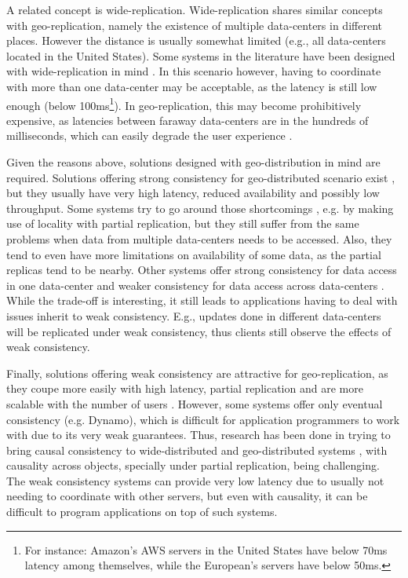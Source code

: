 A related concept is wide-replication.
Wide-replication shares similar concepts with geo-replication, namely the existence of multiple data-centers in different places. 
However the distance is usually somewhat limited (e.g., all data-centers located in the United States).
Some systems in the literature have been designed with wide-replication in mind \cite{spanner, cops}.
In this scenario however, having to coordinate with more than one data-center may be acceptable, as the latency is still low enough \cite{spanner} (below 100ms\footnote{For instance: Amazon's AWS servers in the United States have below 70ms latency among themselves, while the European's servers have below 50ms.}).
In geo-replication, this may become prohibitively expensive, as latencies between faraway data-centers are in the hundreds of milliseconds, which can easily degrade the user experience \cite{mdcc, eiger, chronocache}.


Given the reasons above, solutions designed with geo-distribution in mind are required.
Solutions offering strong consistency for geo-distributed scenario exist \cite{mdcc, slog}, but they usually have very high latency, reduced availability and possibly low throughput.
Some systems try to go around those shortcomings \cite{mdcc, chronocache, slog, walter}, e.g. by making use of locality with partial replication, but they still suffer from the same problems when data from multiple data-centers needs to be accessed.
Also, they tend to even have more limitations on availability of some data, as the partial replicas tend to be nearby.
Other systems offer strong consistency for data access in one data-center and weaker consistency for data access across data-centers \cite{cops, eiger, walter}.
While the trade-off is interesting, it still leads to applications having to deal with issues inherit to weak consistency. E.g., updates done in different data-centers will be replicated under weak consistency, thus clients still observe the effects of weak consistency.

Finally, solutions offering weak consistency are attractive for geo-replication, as they coupe more easily with high latency, partial replication and are more scalable with the number of users \cite{eiger, cure, walter}.
However, some systems offer only eventual consistency (e.g. Dynamo), which is difficult for application programmers to work with due to its very weak guarantees.
Thus, research has been done in trying to bring causal consistency to wide-distributed and geo-distributed systems \cite{cops, eiger, saturn, cure, walter}, with causality across objects, specially under partial replication, being challenging.
The weak consistency systems can provide very low latency due to usually not needing to coordinate with other servers, but even with causality, it can be difficult to program applications on top of such systems. %

